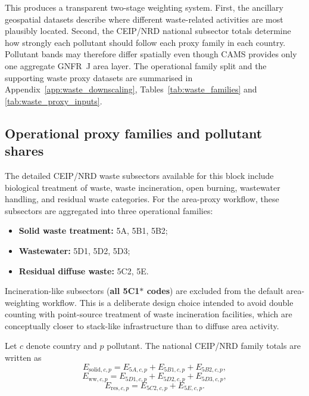 This produces a transparent two-stage weighting system. First, the
ancillary geospatial datasets describe where different waste-related
activities are most plausibly located. Second, the CEIP/NRD national
subsector totals determine how strongly each pollutant should follow
each proxy family in each country. Pollutant bands may therefore differ
spatially even though CAMS provides only one aggregate GNFR~J area layer.
The operational family split and the supporting waste proxy datasets are
summarised in Appendix~\ref{app:waste_downscaling},
Tables~\ref{tab:waste_families} and \ref{tab:waste_proxy_inputs}.

\subsection{Operational proxy families and pollutant shares}

The detailed CEIP/NRD waste subsectors available for this block include
biological treatment of waste, waste incineration, open burning,
wastewater handling, and residual waste categories. For the area-proxy
workflow, these subsectors are aggregated into three operational
families:
\begin{itemize}
  \item \textbf{Solid waste treatment:} 5A, 5B1, 5B2;
  \item \textbf{Wastewater:} 5D1, 5D2, 5D3;
  \item \textbf{Residual diffuse waste:} 5C2, 5E.
\end{itemize}

Incineration-like subsectors (\textbf{all 5C1$\ast$ codes}) are excluded
from the default area-weighting workflow. This is a deliberate design
choice intended to avoid double counting with point-source treatment of
waste incineration facilities, which are conceptually closer to
stack-like infrastructure than to diffuse area activity.

Let $c$ denote country and $p$ pollutant. The national CEIP/NRD family
totals are written as
\begin{equation}
  E_{\mathrm{solid},c,p} =
  E_{5A,c,p} + E_{5B1,c,p} + E_{5B2,c,p},
\end{equation}
\begin{equation}
  E_{\mathrm{ww},c,p} =
  E_{5D1,c,p} + E_{5D2,c,p} + E_{5D3,c,p},
\end{equation}
\begin{equation}
  E_{\mathrm{res},c,p} =
  E_{5C2,c,p} + E_{5E,c,p}.
\end{equation}

